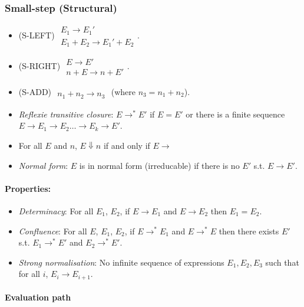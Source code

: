 \documentclass[twocolumn,english]{article}
\begin{document}
\subsubsection{Small-step (Structural)}
\begin{itemize}
\item {\scriptsize{}(S-LEFT)} $\begin{array}{c}
E_{1}\rightarrow E_{1}'\\
\hline E_{1}+E_{2}\rightarrow E_{1}'+E_{2}
\end{array}$.
\item {\scriptsize{}(S-RIGHT)} $\begin{array}{c}
E\rightarrow E'\\
\hline n+E\rightarrow n+E'
\end{array}$.
\item {\scriptsize{}(S-ADD)} $\begin{array}{c}
\\
\hline n_{1}+n_{2}\rightarrow n_{3}
\end{array}$ (where $n_{3}=n_{1}+n_{2}$).
\item \emph{Reflexie transitive closure}: $E\rightarrow^{*}E'$ if $E=E'$
or there is a finite sequence $E\rightarrow E_{1}\rightarrow E_{2}\dots\rightarrow E_{k}\rightarrow E'$.
\item For all $E$ and $n$, $E\Downarrow n$ if and only if $E\rightarrow$
\item \emph{Normal form}: $E$ is in normal form (irreducable) if there
is no $E'$ s.t. $E\rightarrow E'$.
\end{itemize}

\paragraph{Properties:}
\begin{itemize}
\item \emph{Determinacy}: For all $E_{1}$, $E_{2}$, if $E\rightarrow E_{1}$
and $E\rightarrow E_{2}$ then $E_{1}=E_{2}$.
\item \emph{Confluence}: For all $E$, $E_{1}$, $E_{2}$, if $E\rightarrow^{*}E_{1}$
and $E\rightarrow^{*}E$ then there exists $E'$ s.t. $E_{1}\rightarrow^{*}E'$
and $E_{2}\rightarrow^{*}E'$.
\item \emph{Strong normalisation}: No infinite sequence of expressions $E_{1},E_{2},E_{3}$
such that for all $i$, $E_{i}\rightarrow E_{i+1}$.
\end{itemize}

\paragraph{Evaluation path}
\end{document}
